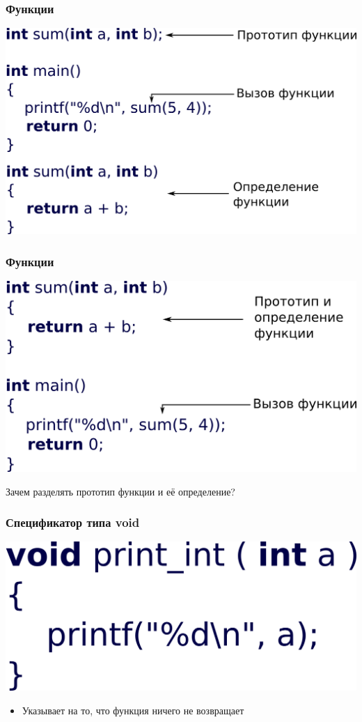\documentclass[12pt,pdf,hyperref={unicode}]{beamer}
\begin{document}
\begin{frame}[fragile]
\frametitle{Функции} 
\begin{center}
\includegraphics[width=0.8\linewidth]{images/function_summary.png}
\end{center}
\end{frame}

\begin{frame}[fragile]
\frametitle{Функции} 
\begin{center}
\includegraphics[width=0.8\linewidth]{images/function_summary2.png}

Зачем разделять прототип функции и её определение?
\end{center}
\end{frame}


\begin{frame}[fragile]
\frametitle{Спецификатор типа void} 
\begin{center}
\includegraphics[width=0.45\linewidth]{images/function_void.png}
\end{center}
\begin{itemize}
\item Указывает на то, что функция ничего не возвращает
\end{itemize}
\end{frame}
\end{document}
